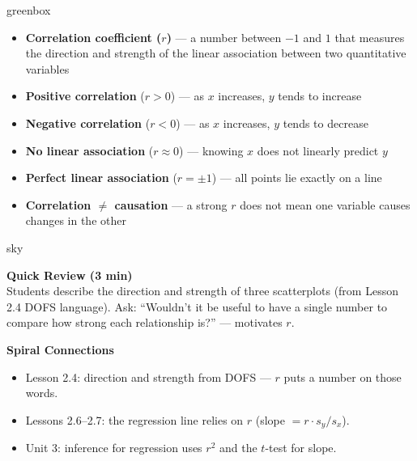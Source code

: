 \documentclass[10pt]{article}
\begin{document}
\begin{skillbox}{greenbox}
\begin{minipage}[t]{0.48\linewidth}
    \begin{itemize}
        \item \textbf{Correlation coefficient ($r$)} --- a number between $-1$ and $1$ that
              measures the direction and strength of the linear association between two
              quantitative variables
        \item \textbf{Positive correlation} ($r > 0$) --- as $x$ increases, $y$ tends to increase
        \item \textbf{Negative correlation} ($r < 0$) --- as $x$ increases, $y$ tends to decrease
    \end{itemize}
\end{minipage}
\hfill
\begin{minipage}[t]{0.48\linewidth}
    \begin{itemize}
        \item \textbf{No linear association} ($r \approx 0$) --- knowing $x$ does not
              linearly predict $y$
        \item \textbf{Perfect linear association} ($r = \pm 1$) --- all points lie exactly
              on a line
        \item \textbf{Correlation $\neq$ causation} --- a strong $r$ does not mean one
              variable causes changes in the other
    \end{itemize}
\end{minipage}
\end{skillbox}

\begin{skillbox}{sky}
\begin{minipage}[t]{0.48\linewidth}
    \textbf{Quick Review (3 min)}\\
    Students describe the direction and strength of three scatterplots (from Lesson 2.4
    DOFS language). Ask: ``Wouldn't it be useful to have a single number to compare
    how strong each relationship is?'' --- motivates $r$.
\end{minipage}
\hfill
\begin{minipage}[t]{0.48\linewidth}
    \textbf{Spiral Connections}
    \begin{itemize}
        \item Lesson 2.4: direction and strength from DOFS --- $r$ puts a number on those words.
        \item Lessons 2.6--2.7: the regression line relies on $r$ (slope $= r \cdot s_y/s_x$).
        \item Unit 3: inference for regression uses $r^2$ and the $t$-test for slope.
    \end{itemize}
\end{minipage}
\end{skillbox}
\end{document}
